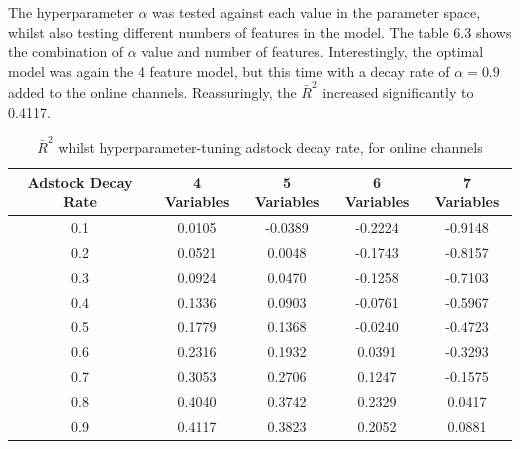 \documentclass[11pt, a4paper]{article}
\begin{document}
The hyperparameter $\alpha$ was tested against each value in the parameter space, whilst also testing different numbers of features in the model. The table 6.3 shows the combination of $\alpha$ value and number of features. Interestingly, the optimal model was again the 4 feature model, but this time with a decay rate of $\alpha = 0.9$ added to the online channels. Reassuringly, the $\bar{R}^2$ increased significantly to 0.4117. 

\begin{table}[h!]
    \centering
    \begin{tabular}{c|cccc}
        \toprule
        \textbf{Adstock Decay Rate} & \textbf{4 Variables} & \textbf{5 Variables} & \textbf{6 Variables} & \textbf{7 Variables} \\
        \midrule
        0.1 & 0.0105 & -0.0389 & -0.2224 & -0.9148 \\
        0.2 & 0.0521 & 0.0048 & -0.1743 & -0.8157 \\
        0.3 & 0.0924 & 0.0470 & -0.1258 & -0.7103 \\
        0.4 & 0.1336 & 0.0903 & -0.0761 & -0.5967 \\
        0.5 & 0.1779 & 0.1368 & -0.0240 & -0.4723 \\
        0.6 & 0.2316 & 0.1932 & 0.0391 & -0.3293 \\
        0.7 & 0.3053 & 0.2706 & 0.1247 & -0.1575 \\
        0.8 & 0.4040 & 0.3742 & 0.2329 & 0.0417 \\
        0.9 & 0.4117 & 0.3823 & 0.2052 & 0.0881 \\
        \bottomrule
    \end{tabular}

    \caption{$\bar{R}^2$
whilst hyperparameter-tuning adstock decay rate, for online channels}
    \label{tab:adstock_r2}
\end{table}
\end{document}
